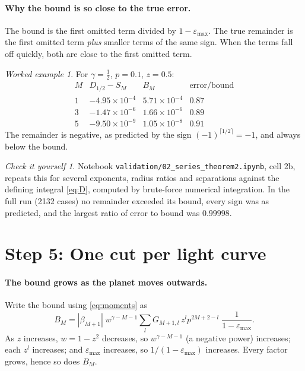 \documentclass[11pt,a4paper]{article}
\theoremstyle{remark}
\newtheorem*{example}{Worked example}
\newtheorem*{checkit}{Check it yourself}
\newcommand{\nb}[1]{\texttt{validation/#1}}
\begin{document}
\paragraph{Why the bound is so close to the true error.} The bound is the first omitted term
divided by $1-\varepsilon_{\max}$. The true remainder is the first omitted term \emph{plus} smaller
terms of the same sign. When the terms fall off quickly, both are close to the first omitted term.

\begin{example}
For $\gamma=\tfrac12$, $p=0.1$, $z=0.5$:
\[
\begin{array}{c|ccc}
 M & D_{1/2}-S_M & B_M & \text{error}/\text{bound}\\\hline
 1 & -4.95\times10^{-4} & 5.71\times10^{-4} & 0.87\\
 3 & -1.47\times10^{-6} & 1.66\times10^{-6} & 0.89\\
 5 & -9.50\times10^{-9} & 1.05\times10^{-8} & 0.91
\end{array}
\]
The remainder is negative, as predicted by the sign $(-1)^{\lceil1/2\rceil}=-1$, and always below
the bound.
\end{example}

\begin{checkit}
Notebook \nb{02\_series\_theorem2.ipynb}, cell 2b, repeats this for several exponents, radius
ratios and separations against the defining integral \eqref{eq:D}, computed by brute-force
numerical integration. In the full run (2132 cases) no remainder exceeded its bound, every sign was
as predicted, and the largest ratio of error to bound was $0.99998$.
\end{checkit}

\section{Step 5: One cut per light curve}

\paragraph{The bound grows as the planet moves outwards.} Write the bound using
\eqref{eq:moments} as
\[
  B_M=|\beta_{M+1}|\;w^{\gamma-M-1}\sum_l G_{M+1,l}\,z^lp^{2M+2-l}\;\frac{1}{1-\varepsilon_{\max}}.
\]
As $z$ increases, $w=1-z^2$ decreases, so $w^{\gamma-M-1}$ (a negative power) increases; each
$z^l$ increases; and $\varepsilon_{\max}$ increases, so $1/(1-\varepsilon_{\max})$ increases. Every
factor grows, hence so does $B_M$.
\end{document}
